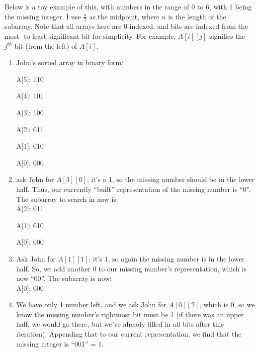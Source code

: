 \documentclass[12pt]{article}
\begin{document}
\begin{enumerate}
\begin{enumerate}
        \newpage

        Below is a toy example of this, with numbers in the range of 0 to 6, with 1 being the missing integer. I use $\frac{n}{2}$
        as the midpoint, where $n$ is the length of the subarray. Note that all arrays here 
        are 0-indexed, and bits are indexed from the most- to least-significant bit for simplicity. For example, $A[i][j]$ signifies the $j^{th}$ bit 
        (from the left) of $A[i]$.

        \begin{enumerate}
            \item John's sorted array in binary form:

            A[5]: 110

            A[4]: 101

            A[3]: 100

            A[2]: 011

            A[1]: 010

            A[0]: 000\\

            \item ask John for $A[3][0]$; it's a 1, so the missing number should be in the lower half. 
            Thus, our currently ``built'' representation of the missing number is ``0''. The subarray to search in now is:\\
            
            A[2]: 011

            A[1]: 010

            A[0]: 000\\

            \item Ask John for $A[1][1]$; it's 1, so again the missing number is in the lower half. So, we 
            add another 0 to our missing number's representation, which is now ``00''. The subarray is now:\\
            
            A[0]: 000\\

            \item We have only 1 number left, and we ask John for $A[0][2]$, which is 0, so we know the missing number's rightmost bit must 
            be 1 (if there was an upper half, we would go there, but we've already filled in all bits after this iteration). Appending that to our current representation, we find that 
            the missing integer is ``001'' = 1.


\end{enumerate}
\end{enumerate}
\end{enumerate}
\end{document}
